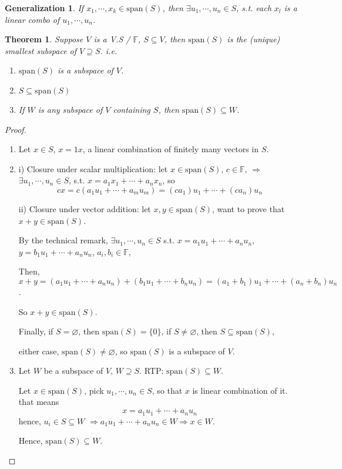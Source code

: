 \documentclass[12pt]{article}
\theoremstyle{plain}
\newtheorem{theorem}{Theorem}[subsection]
\newtheorem{generalization}{Generalization}[subsection]
\newcommand{\Span}{\mathrm{span}}
\newcommand{\mF}{{\mathbb{F}}}
\let\emptyset\varnothing
\begin{document}
	
	\begin{generalization}
		If $x_1,\cdots, x_k \in \Span(S)$, then $\exists u_1, \cdots, u_n \in S$,
		s.t. each $x_l$ is a linear combo of $u_1, \cdots, u_n$. \\
	\end{generalization}

	\begin{theorem}
		Suppose $V$ is a V.S / $\mF$, $S\subseteq V$, then $\Span(S)$ is the
		(unique) smallest subspace of $V \supseteq S$. 
		i.e. 
		\begin{enumerate}
			\item $\Span(S)$ is a subspace of $V$.
			\item $S \subseteq \Span(S)$
			\item If $W$ is any subspace of $V$ containing $S$, then 
				$\Span(S) \subseteq W$. 
		\end{enumerate}
	\end{theorem}
	\begin{proof}
		$ $
		\begin{enumerate}
		\item Let $x\in S$, $x = 1x$, a linear combination of finitely many 
		vectors in $S$. 

		\item  i) Closure under scalar multiplication: let $x \in \Span(S)$, 
		$c\in \mathbb{F}$, $\Rightarrow$ $\exists u_1, \cdots, u_n\in S$, s.t.
		$x = a_1x_1 + \cdots+a_nx_n$, so 
		\[
			cx = c (a_1u_1+\cdots+a_mu_m) = (ca_1)u_1+\cdots+(ca_n)u_n
		\]

		ii) Closure under vector addition: 
		let $x, y \in \Span (S)$, want to prove that $x+y \in \Span(S)$. 

		By the technical remark, $\exists u_1, \cdots, u_n \in S$ s.t. 
		$x = a_1u_1+\cdots+ a_nu_n$, $y = b_1u_1+\cdots+a_nu_n$, 
		$a_i,b_i\in\mF$,

		Then, $x+y  = (a_1u_1+\cdots+a_nu_n) + (b_1u_1+\cdots+b_nu_n)
		=(a_1+b_1)u_1+\cdots+(a_n+b_n)u_n$.
		
		So $x+y \in \Span(S)$. 

		Finally, if $S = \emptyset$, then $\Span(S) = \{0\}$, if 
		$S \neq \emptyset$, then $S\subseteq \Span(S)$, 

		either case, $\Span(S) \neq \emptyset$, so $\Span(S)$ is a 
		subspace of $V$.
	
		\item
			Let $W$ be a subspace of $V$, $W \supseteq S$. 
			RTP: $\Span(S) \subseteq W$.
	
		Let $x \in \Span(S)$, pick $u_1, \cdots, u_n \in S$, so that $x$ is 
		linear combination of it. 
		that means 
		\[
			x = a_1u_1 + \cdots + a_nu_n
		\]
		hence, $u_i \in S \subseteq W$ $\Rightarrow a_1u_1 + \cdots + a_nu_n \in W
		 \Rightarrow x \in W$. 
	
		Hence, $\Span(S) \subseteq W$.
		\end{enumerate}
	\end{proof}
		
\end{document}

